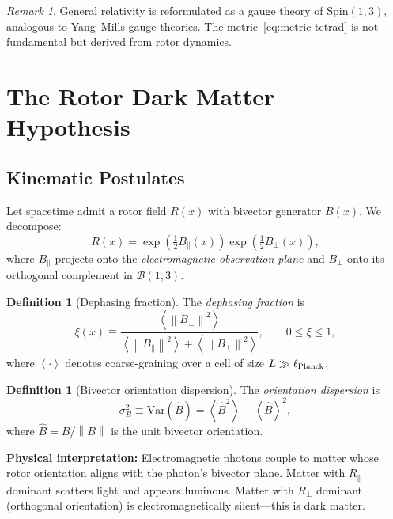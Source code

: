 \documentclass[11pt,a4paper]{article}
\numberwithin{equation}{section}
\theoremstyle{plain}
\theoremstyle{definition}
\newtheorem{definition}[theorem]{Definition}
\theoremstyle{remark}
\newtheorem{remark}[theorem]{Remark}
\newcommand{\Var}{\mathrm{Var}}
\newcommand{\norm}[1]{\left\lVert#1\right\rVert}
\newcommand{\avg}[1]{\left\langle #1 \right\rangle}
\newcommand{\Spin}{\mathrm{Spin}}
\newcommand{\bivec}{\mathcal{B}}            %
\begin{document}
\begin{remark}
General relativity is reformulated as a gauge theory of $\Spin(1,3)$, analogous to Yang--Mills gauge theories. The metric~\eqref{eq:metric-tetrad} is not fundamental but derived from rotor dynamics.
\end{remark}

\vspace{1em}

\section{The Rotor Dark Matter Hypothesis}\label{sec:rotor-dm}

\subsection{Kinematic Postulates}

Let spacetime admit a rotor field $R(x)$ with bivector generator $B(x)$. We decompose:
\begin{equation}
R(x)=\exp\!\left(\tfrac12 B_\parallel(x)\right)\exp\!\left(\tfrac12 B_\perp(x)\right),
\label{eq:rotor-decomp}
\end{equation}
where $B_\parallel$ projects onto the \emph{electromagnetic observation plane} and $B_\perp$ onto its orthogonal complement in $\bivec(1,3)$.

\begin{definition}[Dephasing fraction]
The \emph{dephasing fraction} is
\begin{equation}
\xi(x) \equiv \frac{\avg{ \norm{B_\perp}^2 }}{\avg{ \norm{B_\parallel}^2 }+\avg{ \norm{B_\perp}^2 }},
\qquad 0\le\xi\le 1,
\label{eq:xi-def}
\end{equation}
where $\avg{\cdot}$ denotes coarse-graining over a cell of size $L\gg \ell_{\rm Planck}$.
\end{definition}

\begin{definition}[Bivector orientation dispersion]
The \emph{orientation dispersion} is
\begin{equation}
\sigma_B^2 \equiv \Var(\hat B) = \avg{\hat B^2} - \avg{\hat B}^2,
\end{equation}
where $\hat B = B/\norm{B}$ is the unit bivector orientation.
\end{definition}

\textbf{Physical interpretation:} Electromagnetic photons couple to matter whose rotor orientation aligns with the photon's bivector plane. Matter with $R_\parallel$ dominant scatters light and appears luminous. Matter with $R_\perp$ dominant (orthogonal orientation) is electromagnetically silent---this is dark matter.
\end{document}
